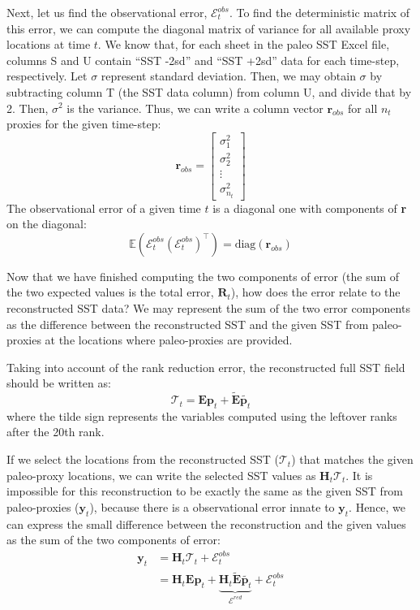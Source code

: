 \documentclass{article}
\begin{document}
\begin{enumerate}
    Next, let us find the observational error, $\mathcal{E}^{obs}_t$.
    To find the deterministic matrix of this error, we can compute the diagonal matrix of variance for all available proxy locations at time $t$. We know that, for each sheet in the paleo SST Excel file, columns S and U contain “SST -2sd” and “SST +2sd” data for each time-step, respectively. Let $\sigma$ represent standard deviation. Then, we may obtain $\sigma$ by subtracting column T (the SST data column) from column U, and divide that by 2. Then, $\sigma^2$ is the variance.
    Thus, we can write a column vector $\textbf{r}_{obs}$ for all $n_t$ proxies for the given time-step:
    $$\textbf{r}_{obs} = \begin{bmatrix}
        \sigma^2_1 \\
        \sigma^2_2 \\
        \vdots \\
        \sigma^2_{n_t}
    \end{bmatrix}$$
    The observational error of a given time $t$ is a diagonal one with components of \textbf{r} on the diagonal:
    $$\mathbb{E}(\mathcal{E}^{obs}_t (\mathcal{E}^{obs}_t)^\intercal) = \text{diag}(\textbf{r}_{obs})$$

    Now that we have finished computing the two components of error (the sum of the two expected values is the total error, $\textbf{R}_t$), how does the error relate to the reconstructed SST data?
    We may represent the sum of the two error components as the difference between the reconstructed SST and the given SST from paleo-proxies at the locations where paleo-proxies are provided.
    
    Taking into account of the rank reduction error, the reconstructed full SST field should be written as:
    $$\mathcal{T}_t = \textbf{E} \textbf{p}_t + \tilde{\textbf{E}} \tilde{\textbf{p}_t}$$
    where the tilde sign represents the variables computed using the leftover ranks after the 20th rank.
    
    If we select the locations from the reconstructed SST ($\mathcal{T}_t$) that matches the given paleo-proxy locations, we can write the selected SST values as $\textbf{H}_t \mathcal{T}_t$. 
    It is impossible for this reconstruction to be exactly the same as the given SST from paleo-proxies ($\textbf{y}_t$), because there is a observational error innate to $\textbf{y}_t$.
    Hence, we can express the small difference between the reconstruction and the given values as the sum of the two components of error:
    \begin{align*}
        \textbf{y}_t &= \textbf{H}_t \mathcal{T}_t + \mathcal{E}^{obs}_t \\
        &= \textbf{H}_t \textbf{E} \textbf{p}_t + \underbrace{\textbf{H}_t \tilde{\textbf{E}} \tilde{\textbf{p}_t}}_{\mathcal{E}^{red}} + \mathcal{E}^{obs}_t
    \end{align*}


\end{enumerate}
\end{document}
